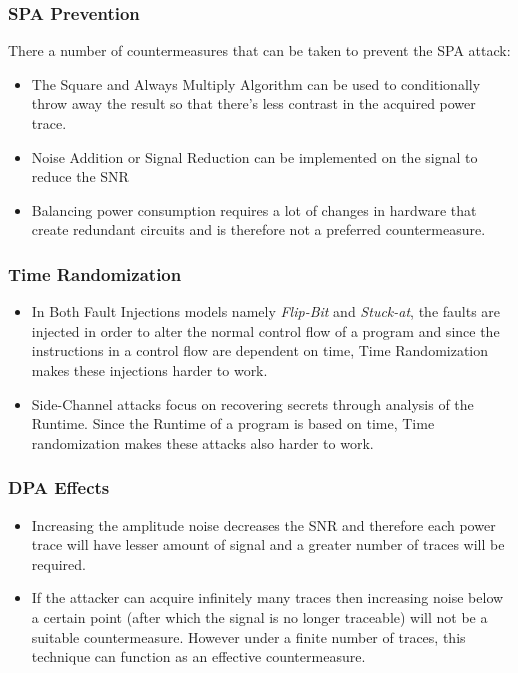 \documentclass[1p,16pt]{elsarticle}
\begin{document}
\subsubsection{SPA Prevention}%
\label{sub:spa_prevention}
There a number of countermeasures that can be taken to prevent the SPA attack:
\begin{itemize}
	\item The Square and Always Multiply Algorithm can be used to conditionally throw away the result
		so that there's less contrast in the acquired power trace.
	\item Noise Addition or Signal Reduction can be implemented on the signal to reduce the SNR
	\item Balancing power consumption requires a lot of changes in hardware that create redundant circuits
		and is therefore not a preferred countermeasure.
\end{itemize}

\subsubsection{Time Randomization}%
\label{ssub:time_randomization}
\begin{itemize}
	\item In Both Fault Injections models namely \textit{Flip-Bit} and \textit{Stuck-at},
		the faults are injected in order to alter the normal control flow of a program
		and since the instructions in a control flow are dependent on time, Time Randomization
		makes these injections harder to work.
	\item Side-Channel attacks focus on recovering secrets through analysis of the Runtime.
		Since the Runtime of a program is based on time, Time randomization makes these attacks
		also harder to work.
\end{itemize}

\subsubsection{DPA Effects}%
\label{ssub:dpa_effects}
\begin{itemize}
	\item Increasing the amplitude noise decreases the SNR and therefore each power trace
		will have lesser amount of signal and a greater number of traces will be required.
	\item If the attacker can acquire infinitely many traces then increasing noise below a certain
		point (after which the signal is no longer traceable)
		will not be a suitable countermeasure. However under a finite number of traces,
		this technique can function as an effective countermeasure.
\end{itemize}
\end{document}
